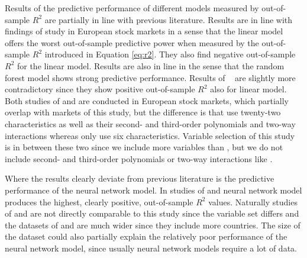 \documentclass[12pt]{article}
\begin{document}
Results of the predictive performance of different models measured by out-of-sample $R^2$ are partially in line with previous literature. Results are in line with findings of \citet{Drobetz} study in European stock markets in a sense that the linear model offers the worst out-of-sample predictive power when measured by the out-of-sample $R^2$ introduced in Equation \ref{eq:r2}. They also find negative out-of-sample $R^2$ for the linear model. Results are also in line in the sense that the random forest model shows strong predictive performance. Results of \ \citet{Fieberg} are slightly more contradictory since they show positive out-of-sample $R^2$ also for linear model\footnotemark. Both studies of \citeauthor{Drobetz} and \citeauthor{Fieberg} are conducted in European stock markets, which partially overlap with markets of this study, but the difference is that \citeauthor{Drobetz} use twenty-two characteristics as well as their  second- and third-order polynomials and two-way interactions whereas \citeauthor{Fieberg} only use six characteristics. Variable selection of this study is in between these two since we include more variables than \citeauthor{Fieberg}, but we do not include second- and third-order polynomials or two-way interactions like \citeauthor{Drobetz}. \par


Where the results clearly deviate from previous literature is the predictive performance of the neural network model. In studies of \citet{Drobetz} and \citet{Fieberg} neural network model produces the highest, clearly positive, out-of-sample $R^2$ values. Naturally studies of \citeauthor{Drobetz} and \citeauthor{Fieberg} are not directly comparable to this study since the variable set differs and the datasets of  \citeauthor{Drobetz} and \citeauthor{Fieberg} are much wider since they include more countries. The size of the dataset could also partially explain the relatively poor performance of the neural network model, since usually neural network models require a lot of data. \par
\end{document}
